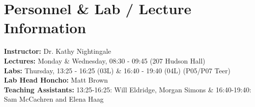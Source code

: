 \section{Personnel \& Lab / Lecture Information}
\textbf{Instructor:} Dr. Kathy Nightingale \\
\textbf{Lectures:} Monday \& Wednesday,  08:30 - 09:45 (207 Hudson Hall)\\
\textbf{Labs:} Thursday, 13:25 - 16:25 (03L) \& 16:40 - 19:40 (04L) (P05/P07 Teer)\\
\textbf{Lab Head Honcho:} Matt Brown\\
\textbf{Teaching Assistants:} 13:25-16:25: Will Eldridge, Morgan Simons \& 16:40-19:40: Sam McCachren and Elena Haag\\ 
